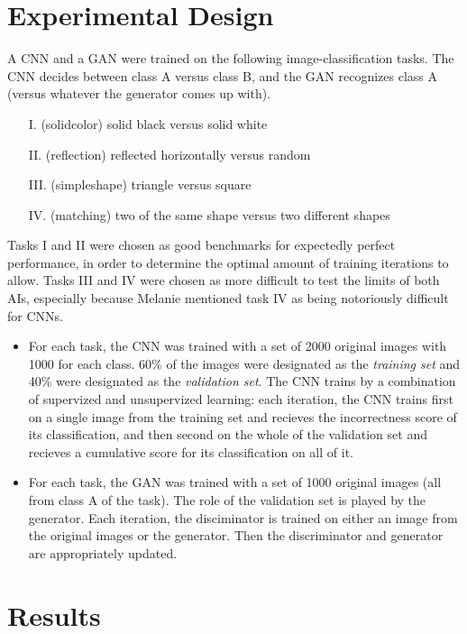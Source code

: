 \documentclass{article}
\renewcommand{\it}{\textit}
\begin{document}
\section{Experimental Design}

A CNN and a GAN were trained on the following image-classification tasks.
The CNN decides between class A versus class B, and the GAN recognizes class A (versus whatever the generator comes up with).
\begin{enumerate}
\item[I.] (solidcolor) solid black versus solid white
\item[II.] (reflection) reflected horizontally versus random
\item[III.] (simpleshape) triangle versus square
\item[IV.] (matching) two of the same shape versus two different shapes
\end{enumerate}

Tasks I and II were chosen as good benchmarks for expectedly perfect performance, in order to determine the optimal amount of training iterations to allow.
Tasks III and IV were chosen as more difficult to test the limits of both AIs, especially because Melanie mentioned task IV as being notoriously difficult for CNNs.

\begin{itemize}
\item
For each task, the CNN was trained with a set of 2000 original images with 1000 for each class.
60\% of the images were designated as the \it{training set} and 40\% were designated as the \it{validation set}.
The CNN trains by a combination of supervized and unsupervized learning: each iteration, the CNN trains first on a single image from the training set and recieves the incorrectness score of its classification, and then second on the whole of the validation set and recieves a cumulative score for its classification on all of it.

\item
For each task, the GAN was trained with a set of 1000 original images (all from class A of the task). The role of the validation set is played by the generator.
Each iteration, the disciminator is trained on either an image from the original images or the generator. Then the discriminator and generator are appropriately updated.
\end{itemize}


\section{Results}
\end{document}
